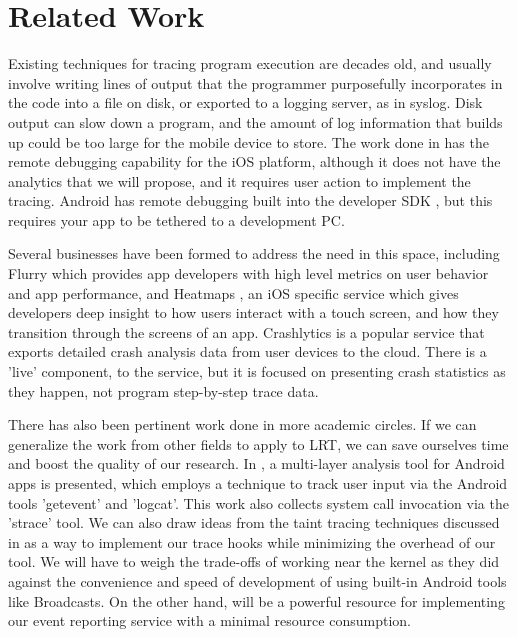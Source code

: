 \documentclass[11pt]{article}
\begin{document}
\section{Related Work} 
Existing techniques for tracing program execution are decades old, and usually 
involve writing lines of output that the programmer purposefully incorporates 
in the code into a file on disk, or exported to a logging server, as in syslog. 
Disk output can slow down a program, and the amount of log information that 
builds up could be too large for the mobile device to store. The work done in 
\cite{NSLogger} has the remote debugging capability for the iOS platform, although 
it does not have the analytics that we will propose, and it requires user action 
to implement the tracing. Android has remote debugging built into the developer 
SDK \cite{AndroidRemoteDebugTool}, but this requires your app to be tethered to a development PC.

Several businesses have been formed to address the need in this space, including
Flurry \cite{Flurry} which provides app developers with high level metrics on
user behavior and app performance, and Heatmaps \cite{Heatmaps}, an iOS specific
service which gives developers deep insight to how users interact with a touch
screen, and how they transition through the screens of an app. 
Crashlytics \cite{Crashlytics} is a popular service that exports detailed
crash analysis data from user devices to the cloud. There is a 'live' component,
to the service, but it is focused on presenting crash statistics as they happen,
not program step-by-step trace data.

There has also been pertinent work done in more academic circles. If we can 
generalize the work from other fields to apply to LRT, we can save ourselves 
time and boost the quality of our research. In \cite{ProfileDroid}, a 
multi-layer analysis tool for Android apps is presented, which employs a 
technique to track user input via the Android tools 'getevent' and 'logcat'. 
This work also collects system call invocation via the 'strace' tool. We 
can also draw ideas from the taint tracing techniques discussed in 
\cite{TaintDroid} as a way to implement our trace hooks while minimizing 
the overhead of our tool. We will have to weigh the trade-offs of working 
near the kernel as they did against the convenience and speed of development 
of using built-in Android tools like Broadcasts. On the other hand, 
\cite{PeriodicTransfers} will be a powerful resource for implementing our 
event reporting service with a minimal resource consumption.
\end{document}
